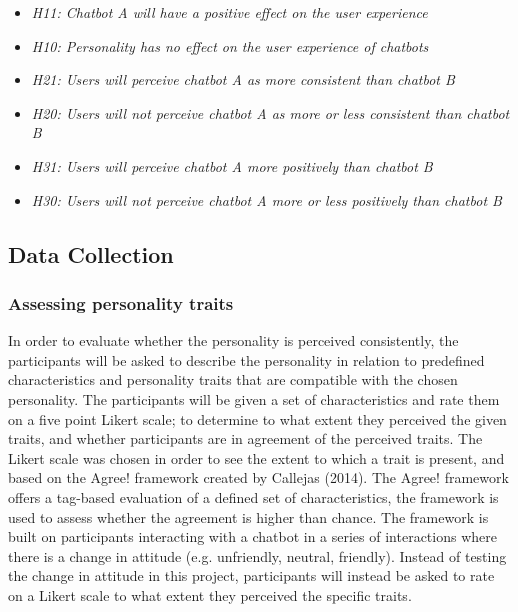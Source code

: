     \begin{itemize}
         \item \textit {H11: Chatbot A will have a positive effect on the user experience}
        \item \textit {H10: Personality has no effect on the user experience of chatbots}
            \vspace{5mm} %

        \item \textit {H21: Users will perceive chatbot A as more consistent than chatbot B}
        \item  \textit {H20: Users will not perceive chatbot A as more or less consistent than chatbot B} 
            \vspace{5mm} %

        \item \textit {H31: Users will perceive chatbot A more positively than chatbot B}
        \item \textit {H30: Users will not perceive chatbot A more or less positively than chatbot B}
    \end{itemize}
    
    \vspace{5mm} %
    
    \subsection{Data Collection}
    
    \vspace{5mm} %

     \subsubsection{Assessing personality traits}
     
     In order to evaluate whether the personality is perceived consistently, the participants will be asked to describe the personality in relation to predefined characteristics and personality traits that are compatible with the chosen personality. The participants will be given a set of characteristics and rate them on a five point Likert scale; to determine to what extent they perceived the given traits, and whether participants are in agreement of the perceived traits. The Likert scale was chosen in order to see the extent to which a trait is present, and based on the Agree! framework created by Callejas (2014). The Agree! framework offers a tag-based evaluation of a defined set of characteristics, the framework is used to assess whether the agreement is higher than chance. The framework is built on participants interacting with a chatbot in a series of interactions where there is a change in attitude (e.g. unfriendly, neutral, friendly). Instead of testing the change in attitude in this project, participants will instead be asked to rate on a Likert scale to what extent they perceived the specific traits.
     
